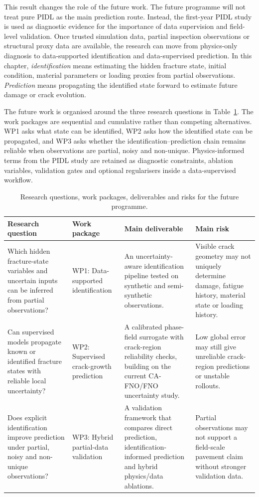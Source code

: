 This result changes the role of the future work. The future programme will not treat pure PIDL as the main prediction route.
Instead, the first-year PIDL study is used as diagnostic evidence for the importance of data supervision and field-level validation.
Once trusted simulation data, partial inspection observations or structural proxy data are available, the research can move from physics-only diagnosis to data-supported identification and data-supervised prediction.
In this chapter, \emph{identification} means estimating the hidden fracture state, initial condition, material parameters or loading proxies from partial observations.
\emph{Prediction} means propagating the identified state forward to estimate future damage or crack evolution.

The future work is organised around the three research questions in Table~\ref{tab:c5_future_work_summary}.
The work packages are sequential and cumulative rather than competing alternatives.
WP1 asks what state can be identified, WP2 asks how the identified state can be propagated, and WP3 asks whether the identification--prediction chain remains reliable when observations are partial, noisy and non-unique.
Physics-informed terms from the PIDL study are retained as diagnostic constraints, ablation variables, validation gates and optional regularisers inside a data-supervised workflow.

\begin{table}[!htbp]
\centering
\caption{Research questions, work packages, deliverables and risks for the future programme.}
\label{tab:c5_future_work_summary}
\begingroup
\footnotesize
\setlength{\tabcolsep}{3pt}
\renewcommand{\arraystretch}{1.12}
\begin{tabular}{p{}p{}p{}p{}}
\hline
Research question & Work package & Main deliverable & Main risk \\
\hline
Which hidden fracture-state variables and uncertain inputs can be inferred from partial observations? &
WP1: Data-supported identification &
An uncertainty-aware identification pipeline tested on synthetic and semi-synthetic observations. &
Visible crack geometry may not uniquely determine damage, fatigue history, material state or loading history. \\
\hline
Can supervised models propagate known or identified fracture states with reliable local uncertainty? &
WP2: Supervised crack-growth prediction &
A calibrated phase-field surrogate with crack-region reliability checks, building on the current CA-FNO/FNO uncertainty study. &
Low global error may still give unreliable crack-region predictions or unstable rollouts. \\
\hline
Does explicit identification improve prediction under partial, noisy and non-unique observations? &
WP3: Hybrid partial-data validation &
A validation framework that compares direct prediction, identification-informed prediction and hybrid physics/data ablations. &
Partial observations may not support a field-scale pavement claim without stronger validation data. \\
\hline
\end{tabular}
\endgroup
\end{table}

